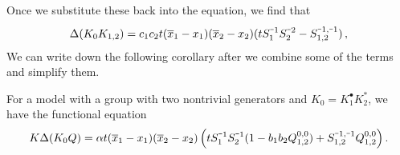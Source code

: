 Once we substitute these back into the equation, we find that
\begin{align}
	\Delta(K_0 K_{1,2}) = c_1c_2t(\ol x_1-x_1)(\ol x_2-x_2)(t S_1^{\um 1} S_2^{\um 2}-S_{1,2}^{\um 1, \um 1})\,,
\end{align}
We can write down the following corollary after we combine some of the terms and simplify them.
\begin{cor} For a \twoD \highSym model with a group with two nontrivial generators and $K_0 = K_1^\bullet K_2^\ast$, we have the functional equation
\begin{align}
	K\Delta(K_0 Q) = \alpha t(\ol x_1-x_1)(\ol x_2-x_2)\left(t S_1^{\um 1}S_2^{\um 1}(1 - b_1b_2\Qf{0,0}) + \Sf{\um 1, \um 1}\Qf{0,0}\right)\!\,.
\end{align}
\end{cor}
